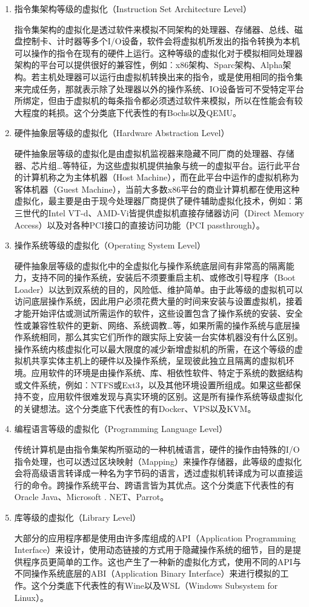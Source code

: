 \begin{enumerate}
    \item 指令集架构等级的虚拟化（Instruction Set Architecture Level）

    指令集架构的虚拟化是透过软件来模拟不同架构的处理器、存储器、总线、磁盘控制卡、计时器等多个I/O设备，软件会将虚拟机所发出的指令转换为本机可以操作的指令在现有的硬件上运行。这种等级的虚拟化对于模拟相同处理器架构的平台可以提供很好的兼容性，例如︰x86架构、Sparc架构、Alpha架构。若主机处理器可以运行由虚拟机转换出来的指令，或是使用相同的指令集来完成任务，那就表示除了处理器以外的操作系统、IO设备皆可不受特定平台所绑定，但由于虚拟机的每条指令都必须透过软件来模拟，所以在性能会有较大程度的耗损。这个分类底下代表性的有Bochs以及QEMU。
    \item 硬件抽象层等级的虚拟化（Hardware Abstraction Level）

    硬件抽象层等级的虚拟化是由虚拟机监视器来隐藏不同厂商的处理器、存储器、芯片组…等特征，为这些虚拟机提供抽象与统一的虚拟平台。运行此平台的计算机称之为主体机器（Host Machine），而在此平台中运作的虚拟机称为客体机器（Guest Machine），当前大多数x86平台的商业计算机都在使用这种虚拟化，最主要是由于现今处理器厂商提供了硬件辅助虚拟化技术，例如︰第三世代的Intel VT-d、AMD-Vi皆提供虚拟机直接存储器访问（Direct Memory Access）以及对各种PCI接口的直接访问功能（PCI passthrough）。
    \item 操作系统等级的虚拟化（Operating System Level）

    硬件抽象层等级的虚拟化中的全虚拟化与操作系统底层间有非常高的隔离能力，支持不同的操作系统，安装后不须要重启主机、或修改引导程序（Boot Loader）以达到双系统的目的，风险低、维护简单。由于此等级的虚拟机可以访问底层操作系统，因此用户必须花费大量的时间来安装与设置虚拟机，接着才能开始评估或测试所需运作的软件，这些设置包含了操作系统的安装、安全性或兼容性软件的更新、网络、系统调教…等，如果所需的操作系统与底层操作系统相同，那么其实它们所作的跟实际上安装一台实体机器没有什么区别。操作系统内核虚拟化可以最大限度的减少新增虚拟机的所需，在这个等级的虚拟机共享实体主机上的硬件以及操作系统，呈现彼此独立且隔离的虚拟机环境。应用软件的环境是由操作系统、库、相依性软件、特定于系统的数据结构或文件系统，例如︰NTFS或Ext3，以及其他环境设置所组成。如果这些都保持不变，应用软件很难发现与真实环境的区别。这是所有操作系统等级虚拟化的关键想法。这个分类底下代表性的有Docker、VPS以及KVM。
    \item 编程语言等级的虚拟化（Programming Language Level）

    传统计算机是由指令集架构所驱动的一种机械语言，硬件的操作由特殊的I/O指令处理，也可以透过区块映射（Mapping）来操作存储器，此等级的虚拟化会将高级语言转译成一种名为字节码的语言，透过虚拟机转译成为可以直接运行的命令。跨操作系统平台、跨语言皆为其优点。这个分类底下代表性的有Oracle Java、Microsoft . NET、Parrot。
    \item 库等级的虚拟化（Library Level）

    大部分的应用程序都是使用由许多库组成的API（Application Programming Interface）来设计，使用动态链接的方式用于隐藏操作系统的细节，目的是提供程序员更简单的工作。这也产生了一种新的虚拟化方式，使用不同的API与不同操作系统底层的ABI（Application Binary Interface）来进行模拟的工作。这个分类底下代表性的有Wine以及WSL（Windows Subsystem for Linux）。
\end{enumerate}

